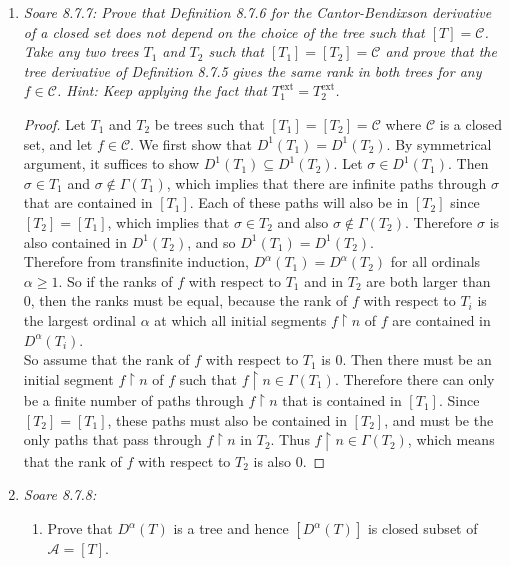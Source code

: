 \documentclass{article}
\begin{document}
\begin{enumerate}[label={\bf Q\arabic*:}]
  \item \it Soare 8.7.7: Prove that Definition 8.7.6 for the
    Cantor-Bendixson derivative of a closed set does not depend on the
    choice of the tree such that $[T]=\mathcal{C}$. Take any two trees
    $T_1$ and $T_2$ such that $[T_1]=[T_2]=\mathcal{C}$ and prove that the
    tree derivative of Definition 8.7.5 gives the same rank in both trees
    for any $f\in\mathcal{C}$. Hint: Keep applying the fact that
    $T_1^{\text{ext}}=T_2^{\text{ext}}$.

    \begin{proof}
      Let $T_1$ and $T_2$ be trees such that $[T_1]=[T_2]=\mathcal{C}$
      where $\mathcal{C}$ is a closed set, and let $f\in\mathcal{C}$.
      We first show that $D^1(T_1)=D^1(T_2)$. By symmetrical argument, it
      suffices to show $D^1(T_1)\subseteq D^1(T_2)$. Let $\sigma\in
      D^1(T_1)$. Then $\sigma\in T_1$ and $\sigma\not\in\Gamma(T_1)$, which
      implies that there are infinite paths through $\sigma$ that are
      contained in $[T_1]$. Each of these paths will also be in $[T_2]$
      since $[T_2]=[T_1]$, which implies that $\sigma\in T_2$ and also
      $\sigma\not\in\Gamma(T_2)$. Therefore $\sigma$ is also contained in
      $D^1(T_2)$, and so $D^1(T_1)=D^1(T_2)$.  \\

      Therefore from transfinite induction, $D^\alpha(T_1)=D^\alpha(T_2)$
      for all ordinals $\alpha\geq1$. So if the ranks of $f$ with respect
      to $T_1$ and in $T_2$ are both larger than 0, then the ranks
      must be equal, because the rank of $f$ with respect to $T_i$ is the
      largest ordinal $\alpha$ at which all initial segments $f\restriction
      n$ of $f$ are contained in $D^\alpha(T_i)$. \\

      So assume that the rank of $f$ with respect to $T_1$ is 0. Then there
      must be an initial segment $f\restriction n$ of $f$ such that
      $f\restriction n \in\Gamma(T_1)$. Therefore there can only be a
      finite number of paths through $f\restriction n$ that is contained in
      $[T_1]$. Since $[T_2]=[T_1]$, these paths must also be contained in
      $[T_2]$, and must be the only paths that pass through $f\restriction
      n$ in $T_2$. Thus $f\restriction n \in\Gamma(T_2)$, which means that
      the rank of $f$ with respect to $T_2$ is also 0.
    \end{proof}

  \item \it Soare 8.7.8:
    \begin{enumerate}[label={(\roman*)}]
      \item Prove that $D^\alpha(T)$ is a tree and hence $[D^\alpha(T)]$ is
        closed subset of $\mathcal{A}=[T]$.


\end{enumerate}
\end{enumerate}
\end{document}
